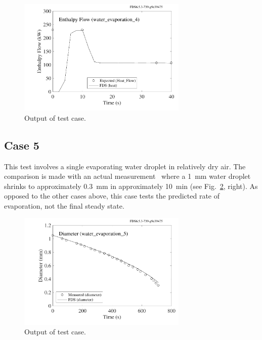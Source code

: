 \documentclass[11pt]{book}
\begin{document}
\begin{figure}[h!]
\begin{center}
\includegraphics[height=2.2in]{SCRIPT_FIGURES/water_evaporation_4_enthalpy}
\end{center}
\caption[Sample case ]{Output of  test case.}
\label{water_evaporation_4_plot}
\end{figure}

\subsection{Case 5}

This test involves a single evaporating water droplet in relatively dry air. The comparison is made with an actual measurement~\cite{Ranz} where a 1~mm water droplet
shrinks to approximately 0.3~mm in approximately 10~min (see Fig.~\ref{water_evaporation_5_plot}, right).
As opposed to the other cases above, this case tests the predicted rate of evaporation, not the final steady state.

\begin{figure}[h!]
\begin{center}
\includegraphics[height=2.2in]{SCRIPT_FIGURES/water_evaporation_5_diameter}
\end{center}
\caption[Sample case ]{Output of  test case.}
\label{water_evaporation_5_plot}
\end{figure}
\end{document}
